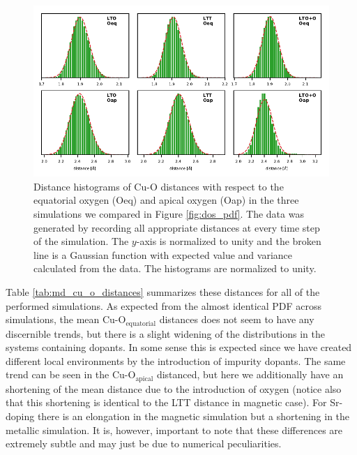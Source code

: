 \begin{figure}
	\centering
	\includegraphics[width=\textwidth]{fig/md/dist_hist.pdf}
	\caption[MD: distance histograms]{Distance histograms of Cu-O distances with respect to the equatorial oxygen (Oeq) and apical oxygen (Oap) in the three simulations we compared in Figure \ref{fig:dos_pdf}. The data was generated by recording all appropriate distances at every time step of the simulation. The $y$-axis is normalized to unity and the broken line is a Gaussian function with expected value and variance calculated from the data. The histograms are normalized to unity.}
	\label{fig:md_distances}
\end{figure}

Table \ref{tab:md_cu_o_distances} summarizes these distances for all of the performed simulations. As expected from the almost identical PDF across simulations, the mean Cu-O$_\text{equatorial}$ distances does not seem to have any discernible trends, but there is a slight widening of the distributions in the systems containing dopants. In some sense this is expected since we have created different local environments by the introduction of impurity dopants. The same trend can be seen in the Cu-O$_\text{apical}$ distanced, but here we additionally have an shortening of the mean distance due to the introduction of oxygen (notice also that this shortening is identical to the LTT distance in magnetic case). For Sr-doping there is an elongation in the magnetic simulation but a shortening in the metallic simulation. It is, however, important to note that these differences are extremely subtle and may just be due to numerical peculiarities.

